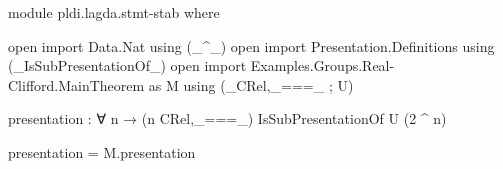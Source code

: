 \begin{code}[hide]
module pldi.lagda.stmt-stab where

open import Data.Nat using (_^_)
open import Presentation.Definitions using (_IsSubPresentationOf_)
open import Examples.Groups.Real-Clifford.MainTheorem as M
  using (_CRel,_===_ ; U)
\end{code}
\begin{code}[number=agda:stab]
presentation : ∀ n → (n CRel,_===_) IsSubPresentationOf U (2 ^ n)
\end{code}
\begin{code}[hide]
presentation = M.presentation
\end{code}
